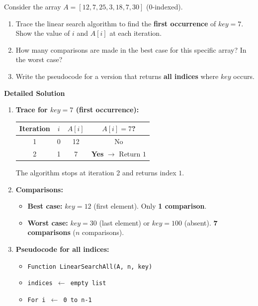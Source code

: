 \documentclass[11pt]{article}
\begin{document}
\begin{exoresolu}
    Consider the array $A = [12, 7, 25, 3, 18, 7, 30]$ (0-indexed). 
    \begin{enumerate}
        \item Trace the linear search algorithm to find the \textbf{first occurrence} of $key = 7$. Show the value of $i$ and $A[i]$ at each iteration.
        \item How many comparisons are made in the best case for this specific array? In the worst case?
        \item Write the pseudocode for a version that returns \textbf{all indices} where $key$ occurs.
    \end{enumerate}
    \tcblower
    \textbf{Detailed Solution}
    \begin{enumerate}
        \item \textbf{Trace for $key = 7$ (first occurrence):}
            \begin{center}
            \begin{tabular}{|c|c|c|c|}\hline
            \rowcolor{popblueL}
            Iteration & $i$ & $A[i]$ & $A[i] = 7$? \\ \hline
            1 & 0 & 12 & No \\ \hline
            2 & 1 & 7 & \textbf{Yes} $\rightarrow$ Return $1$ \\ \hline
            \end{tabular}
            \end{center}
            The algorithm stops at iteration 2 and returns index $1$.
        \item \textbf{Comparisons:}
            \begin{itemize}
                \item \textbf{Best case:} $key = 12$ (first element). Only \textbf{1 comparison}.
                \item \textbf{Worst case:} $key = 30$ (last element) or $key = 100$ (absent). \textbf{7 comparisons} ($n$ comparisons).
            \end{itemize}
        \item \textbf{Pseudocode for all indices:}
            \begin{itemize}
                \item \texttt{Function LinearSearchAll(A, n, key)}
                \item \texttt{\quad indices $\leftarrow$ empty list}
                \item \texttt{\quad For i $\leftarrow$ 0 to n-1}

\end{itemize}
\end{enumerate}
\end{exoresolu}
\end{document}
